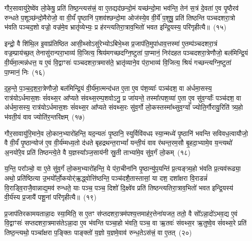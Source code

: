 गौर॒सावायु॑रे॒ष्वे॑व लो॒केषु॒ प्रति॑ तिष्ठ॒न्त्यस॑त्त्रं॒ वा ए॒तद्यद॑छन्दो॒मं यच्छ॑न्दो॒मा भव॑न्ति॒ तेन॑ स॒त्रं दे॒वता॑ ए॒व पृ॒ष्ठैरव॑ रुन्धते प॒शूञ्छ॑न्दो॒मैरोजो॒ वा वी॒र्यं॑ पृ॒ष्ठानि॑ प॒शव॑श्छन्दो॒मा ओज॑स्ये॒व वी॒र्ये॑ प॒शुषु॒ प्रति॑ तिष्ठन्ति पञ्चदशरा॒त्रो भ॑वति पञ्चद॒शो वज्रो॒ वज्र॑मे॒व भ्रातृ॑व्येभ्यः॒ प्र ह॑रन्त्यतिरा॒त्राव॒भितो॑ भवत इन्द्रि॒यस्य॒ परि॑गृहीत्यै॥~(१५)

{\anuvakamend[{अ॒न्तरि॑क्षमिन्द्रि॒यस्यैक॑ञ्च}]}%

इन्द्रो॒ वै शि॑थि॒ल इ॒वाप्र॑तिष्ठित आसी॒थ्सो\-ऽसु॑रेभ्यो\-ऽबिभे॒थ्स प्र॒जा\-प॑ति॒मुपा॑धाव॒त्तस्मा॑ ए॒तम्प॑ञ्चदशरा॒त्रं वज्र॒म्प्राय॑च्छ॒त् तेनासु॑रान्परा॒भाव्य॑ वि॒जित्य॒ श्रिय॑मगच्छदग्नि॒ष्टुता॑ पा॒प्मानं॒ निर॑दहत पञ्चदशरा॒त्रेणौजो॒ बल॑मिन्द्रि॒यं वी॒र्य॑मा॒त्मन्न॑धत्त॒ य ए॒वं वि॒द्वाꣳसः॑ पञ्चदशरा॒त्रमास॑ते॒ भ्रातृ॑व्याने॒व प॑रा॒भाव्य॑ वि॒जित्य॒ श्रियं॑ गच्छन्त्यग्नि॒ष्टुता॑ पा॒प्मानं॒ निः~(१६)

द॒ह॒न्ते॒ प॒ञ्च॒द॒श॒रा॒त्रेणौजो॒ बल॑मिन्द्रि॒यं वी॒र्य॑मा॒त्मन्द॑धत ए॒ता ए॒व प॑श॒व्याः᳚ पञ्च॑दश॒ वा अ॑र्धमा॒सस्य॒ रात्र॑यो\-ऽ\-र्धमास॒शः सं॑वथ्स॒र आ᳚प्यते संवथ्स॒रम्प॒शवो\-ऽनु॒ प्र जा॑यन्ते॒ तस्मा᳚त्पश॒व्या॑ ए॒ता ए॒व सु॑व॒र्ग्याः᳚ पञ्च॑दश॒ वा अ॑र्धमा॒सस्य॒ रात्र॑यो\-ऽर्धमास॒शः सं॑वथ्स॒र आ᳚प्यते संवथ्स॒रः सु॑व॒र्गो लो॒कस्तस्मा᳚थ्सुव॒र्ग्या᳚ ज्योति॒र्गौरायु॒रिति॑ त्र्य॒हो भ॑वती॒यं वाव ज्योति॑र॒न्तरि॑क्षम्~(१७)

गौर॒सावायु॑रि॒माने॒व लो॒कान॒भ्यारो॑हन्ति॒ यद॒न्यतः॑ पृ॒ष्ठानि॒ स्युर्विवि॑वधꣴ स्या॒न्मध्ये॑ पृ॒ष्ठानि॑ भवन्ति सविवध॒त्वायौजो॒ वै वी॒र्यं॑ पृ॒ष्ठान्योज॑ ए॒व वी॒र्य॑म्मध्य॒तो द॑धते बृहद्रथन्त॒रा\-भ्यां᳚ यन्ती॒यं वाव र॑थन्त॒रम॒सौ बृ॒हदा॒भ्यामे॒व य॒न्त्यथो॑ अ॒नयो॑रे॒व प्रति॑ तिष्ठन्त्ये॒ते वै य॒ज्ञस्या᳚ञ्ज॒साय॑नी स्रु॒ती ताभ्या॑मे॒व सु॑व॒र्गं लो॒कम्~(१८)

य॒न्ति॒ परा᳚ञ्चो॒ वा ए॒ते सु॑व॒र्गं लो॒कम॒भ्यारो॑हन्ति॒ ये प॑रा॒चीना॑नि पृ॒ष्ठान्यु॑प॒यन्ति॑ प्र॒त्यङ्त्र्य॒हो भ॑वति प्र॒त्यव॑रूढ्या॒ अथो॒ प्रति॑ष्ठित्या उ॒भयो᳚र्लो॒कयोर्॑ऋ॒द्ध्वोत्ति॑ष्ठन्ति॒ पञ्च॑दशै॒तास्तासां॒ या दश॒ दशा᳚क्षरा वि॒राडन्नं॑ वि॒राड्वि॒राजै॒वान्नाद्य॒\-मव॑ रुन्धते॒ याः पञ्च॒ पञ्च॒ दिशो॑ दि॒क्ष्वे॑व प्रति॑ तिष्ठन्त्यतिरा॒त्राव॒भितो॑ भवत इन्द्रि॒यस्य॑ वी॒र्य॑स्य प्र॒जायै॑ पशू॒नां परि॑गृहीत्यै॥~(१९)

{\anuvakamend[{ग॒च्छ॒न्त्य॒ग्नि॒ष्टुता॑ पा॒प्मान॒न्निर॒न्तरि॑क्षं लो॒कं प्र॒जायै॒ द्वे च॑}]}%

प्र॒जा\-प॑तिरकामयतान्ना॒दः स्या॒मिति॒ स ए॒तꣳ स॑प्तदशरा॒त्रम॑पश्य॒त्तमाह॑र॒त्तेना॑यजत॒ ततो॒ वै सो᳚\-ऽन्ना॒दो॑\-ऽभव॒द्य ए॒वं वि॒द्वाꣳसः॑ सप्तदशरा॒त्रमास॑ते\-ऽन्ना॒दा ए॒व भ॑वन्ति पञ्चा॒हो भ॑वति॒ पञ्च॒ वा ऋ॒तवः॑ संवथ्स॒र ऋ॒तुष्वे॒व सं॑वथ्स॒रे प्रति॑ तिष्ठ॒न्त्यथो॒ पञ्चा᳚क्षरा प॒ङ्क्तिः पाङ्क्तो॑ य॒ज्ञो य॒ज्ञमे॒वाव॑ रुन्ध॒ते\-ऽस॑त्त्रं॒ वा ए॒तत्~(२०)

